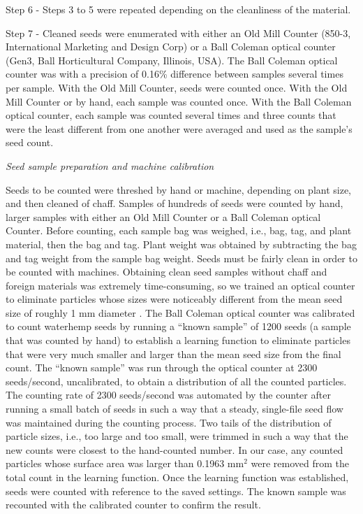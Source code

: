 \documentclass[
]{article}
\begin{document}
Step 6 - Steps 3 to 5 were repeated depending on the cleanliness of the material.

Step 7 - Cleaned seeds were enumerated with either an Old Mill Counter (850-3, International Marketing and Design Corp) or a Ball Coleman optical counter (Gen3, Ball Horticultural Company, Illinois, USA). The Ball Coleman optical counter was with a precision of 0.16\% difference between samples several times per sample. With the Old Mill Counter, seeds were counted once. With the Old Mill Counter or by hand, each sample was counted once. With the Ball Coleman optical counter, each sample was counted several times and three counts that were the least different from one another were averaged and used as the sample's seed count.

\emph{Seed sample preparation and machine calibration}

Seeds to be counted were threshed by hand or machine, depending on plant size, and then cleaned of chaff.
Samples of hundreds of seeds were counted by hand, larger samples with either an Old Mill Counter or a Ball Coleman optical Counter. Before counting, each sample bag was weighed, i.e., bag, tag, and plant material, then the bag and tag.
Plant weight was obtained by subtracting the bag and tag weight from the sample bag weight.
Seeds must be fairly clean in order to be counted with machines.
Obtaining clean seed samples without chaff and foreign materials was extremely time-consuming, so we trained an optical counter to eliminate particles whose sizes were noticeably different from the mean seed size of roughly 1 mm diameter \citep{bellTimeRequirementPollination2010}.
The Ball Coleman optical counter was calibrated to count waterhemp seeds by running a ``known sample'' of 1200 seeds (a sample that was counted by hand) to establish a learning function to eliminate particles that were very much smaller and larger than the mean seed size from the final count.
The ``known sample'' was run through the optical counter at 2300 seeds/second, uncalibrated, to obtain a distribution of all the counted particles.
The counting rate of 2300 seeds/second was automated by the counter after running a small batch of seeds in such a way that a steady, single-file seed flow was maintained during the counting process.
Two tails of the distribution of particle sizes, i.e., too large and too small, were trimmed in such a way that the new counts were closest to the hand-counted number.
In our case, any counted particles whose surface area was larger than 0.1963 mm\(^2\) were removed from the total count in the learning function.
Once the learning function was established, seeds were counted with reference to the saved settings.
The known sample was recounted with the calibrated counter to confirm the result.
\end{document}
